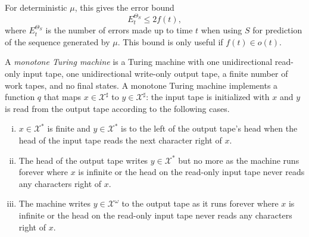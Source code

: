 \documentclass[a4paper]{article}
\def\X{\mathcal{X}}
\begin{document}
For deterministic $\mu$,
this gives the error bound~\cite[Thm.\ 3.36]{Hutter:2005}
\[
E_t^{\Theta_S} \leq 2f(t),
\]
where $E_t^{\Theta_S}$ is the number of errors made up to time $t$
when using $S$ for prediction of the sequence generated by $\mu$.
This bound is only useful if $f(t) \in o(t)$.


\begin{definition}
\label{def:monotone-TM}
A \emph{monotone Turing machine}
is a Turing machine with
one unidirectional read-only input tape,
one unidirectional write-only output tape,
a finite number of work tapes, and no final states.
A monotone Turing machine implements a function $q$
that maps $x \in \X^\sharp$ to $y \in \X^\sharp$:
the input tape is initialized with $x$
and $y$ is read from the output tape according to the following cases.
\begin{enumerate}[(i)]
\item $x \in \X^*$ is finite and
	$y \in \X^*$ is to the left of the output tape's head when
	the head of the input tape reads the next character right of $x$.
\item The head of the output tape writes $y \in \X^*$ but no more
	as the machine runs forever where
	$x$ is infinite or
	the head on the read-only input tape never reads any characters right of $x$.
\item The machine writes $y \in \X^\omega$ to the output tape
	as it runs forever where
	$x$ is infinite or
	the head on the read-only input tape never reads any characters right of $x$.
\end{enumerate}
\end{definition}




\end{document}
